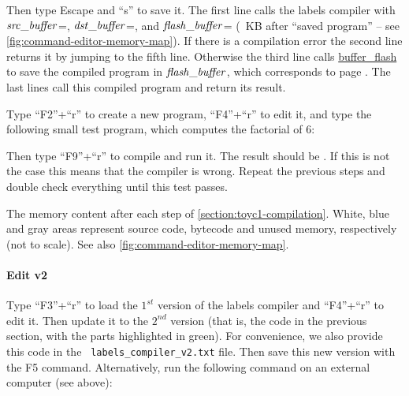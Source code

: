 Then type Escape and ``s'' to save it. The first line calls the labels compiler
with $\it{src\_buffer}$=,
$\it{dst\_buffer}$=, and
$\it{flash\_buffer}$=
(~KB after ``saved program'' -- see
\cref{fig:command-editor-memory-map}). If there is a compilation error the
second line returns it by jumping to the fifth line. Otherwise the third line
calls \hyperlink{buffer-flash}{buffer\_flash} to save the compiled program in
$\it{flash\_buffer}$, which corresponds to page
.
The last lines call this compiled program and return its result.

Type ``F2''+``r'' to create a new program, ``F4''+``r'' to edit it, and type
the following small test program, which computes the factorial of 6:


\noindent Then type ``F9''+``r'' to compile and run it. The result should be
. If this is not the case this means that the compiler is
wrong. Repeat the previous steps and double check everything until this test
passes.


\begin{Figure}
  

  \caption{The memory content after each step of
  \cref{section:toyc1-compilation}. White, blue and gray areas represent source
  code, bytecode and unused memory, respectively (not to scale). See also
  \cref{fig:command-editor-memory-map}.}\label{fig:compilation-and-test}
\end{Figure}

\medskip \paragraph*{Edit v2} Type ``F3''+``r'' to load the $1^{st}$ version of
the labels compiler and ``F4''+``r'' to edit it. Then update it to the $2^{nd}$
version (that is, the code in the previous section, with the parts highlighted
in green). For convenience, we also provide this code in the {\tt
labels\_compiler\_v2.txt} file. Then save this new version with the F5 command.
Alternatively, run the following command on an external computer (see above):

